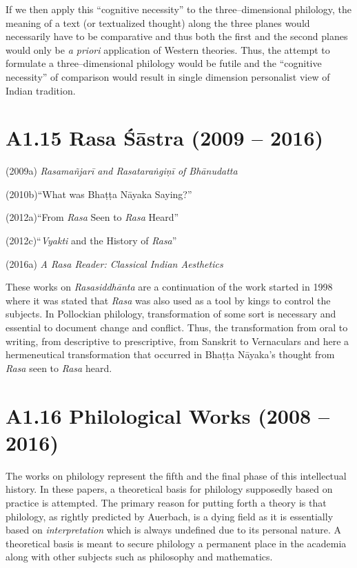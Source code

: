 If we then apply this “cognitive necessity” to the three–dimensional philology, the meaning of a text (or textualized thought) along the three planes would necessarily have to be comparative and thus both the first and the second planes would only be \textit{a priori} application of Western theories. Thus, the attempt to formulate a three–dimensional philology would be futile and the “cognitive necessity” of comparison would result in single dimension personalist view of Indian tradition.


\section*{A1.15 Rasa Śāstra (2009 – 2016)}

\item (2009a)\textit{ Rasamañjarī and Rasataraṅgiṇī of Bhānudatta }

 \item (2010b)“What was Bhaṭṭa Nāyaka Saying?”

 \item (2012a)“From \textit{Rasa} Seen to \textit{Rasa} Heard”

 \item (2012c)“\textit{Vyakti }and the History of\textit{ Rasa}”

 \item (2016a) \textit{A Rasa Reader: Classical Indian Aesthetics}

These works on \textit{Rasasiddhānta} are a continuation of the work started in 1998 where it was stated that \textit{Rasa} was also used as a tool by kings to control the subjects. In Pollockian philology, transformation of some sort is necessary and essential to document change and conflict. Thus, the transformation from oral to writing, from descriptive to prescriptive, from Sanskrit to Vernaculars and here a hermeneutical transformation that occurred in Bhaṭṭa Nāyaka’s thought from\textit{ Rasa} seen to \textit{Rasa} heard.


\section*{A1.16 Philological Works (2008 – 2016)}

The works on philology represent the fifth and the final phase of this intellectual history. In these papers, a theoretical basis for philology supposedly based on practice is attempted. The primary reason for putting forth a theory is that philology, as rightly predicted by Auerbach, is a dying field as it is essentially based on \textit{interpretation} which is always undefined due to its personal nature. A theoretical basis is meant to secure philology a permanent place in the academia along with other subjects such as philosophy and mathematics.

